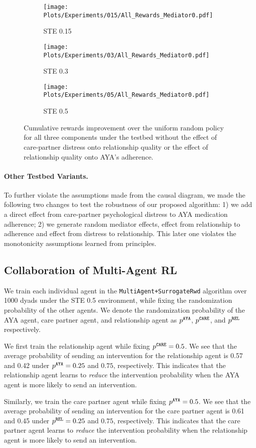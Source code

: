 \begin{figure}[hpt]
    \centering
    \begin{subfigure}[b]{0.31\textwidth}
        \texttt{[image: Plots/Experiments/015/All\_Rewards\_Mediator0.pdf]}
        \caption{STE 0.15}
    \end{subfigure}
    \begin{subfigure}[b]{0.31\textwidth}
        \texttt{[image: Plots/Experiments/03/All\_Rewards\_Mediator0.pdf]}
        \caption{STE 0.3}
    \end{subfigure}
    \begin{subfigure}[b]{0.31\textwidth}
        \texttt{[image: Plots/Experiments/05/All\_Rewards\_Mediator0.pdf]}
        \caption{STE 0.5}
    \end{subfigure}
    \caption{Cumulative rewards improvement over the uniform random policy for all three components under the testbed without the effect of care-partner distress onto relationship quality or the effect of relationship quality onto AYA's adherence.}
    \label{fig:mediator0}
\end{figure}

\paragraph{Other Testbed Variants.} To further violate the assumptions made from the causal diagram, we made the following two changes to test the robustness of our proposed algorithm: 1) we add a direct effect from care-partner psychological distress to AYA medication adherence; 2) we generate random mediator effects, effect from relationship to adherence and effect from distress to relationship. This later one violates the monotonicity assumptions learned from principles.

\subsection{Collaboration of Multi-Agent RL} 

We train each individual agent in the \texttt{MultiAgent+SurrogateRwd} algorithm over 1000 dyads under the STE 0.5 environment, while fixing the randomization probability of the other agents. We denote the randomization probability of the AYA agent, care partner agent, and relationship agent as $p^{\tiny\texttt{AYA}}$, $p^{\tiny\texttt{CARE}}$, and $p^{\tiny\texttt{REL}}$ respectively.

We first train the relationship agent while fixing $p^{\tiny\texttt{CARE}} = 0.5$. We see that the average probability of sending an intervention for the relationship agent is 0.57 and 0.42 under $p^{\tiny\texttt{AYA}} = 0.25$ and $0.75$, respectively. This indicates that the relationship agent learns to \textit{reduce} the intervention probability when the AYA agent is more likely to send an intervention. 

Similarly, we train the care partner agent while fixing $p^{\tiny\texttt{AYA}} = 0.5$. We see that the average probability of sending an intervention for the care partner agent is 0.61 and 0.45 under $p^{\tiny\texttt{REL}} = 0.25$ and $0.75$, respectively. This indicates that the care partner agent learns to \textit{reduce} the intervention probability when the relationship agent is more likely to send an intervention.